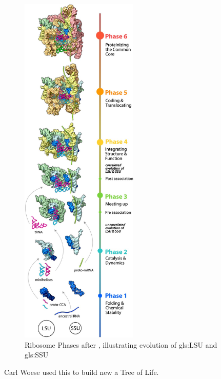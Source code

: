 \documentclass[]{article}
\begin{document}
\begin{figure}[H]
	\caption[Ribosome Phases]{Ribosome Phases after \cite{petrov2015history}, illustrating evolution of  \gls{gls:LSU} and \gls{gls:SSU}}\label{fig:RibosomePhases} 
	\includegraphics[width=0.5\textwidth]{RibosomePhases}
\end{figure}

Carl Woese used this to build new a Tree of Life.
\end{document}
